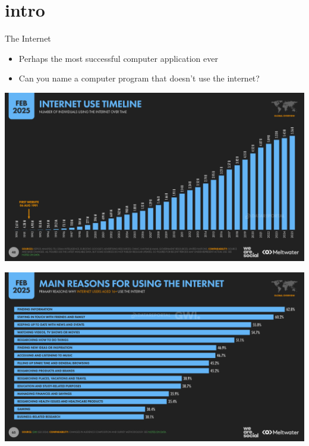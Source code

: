 


\section{intro}

\begin{frame}{The Internet}
    \begin{itemize}
    \item Perhaps the most successful computer application ever
    \item Can you name a computer program that doesn't use the internet?
    \end{itemize}
\end{frame}

\begin{frame}{}
\begin{center}
\includegraphics[width=0.8\pagewidth]{internet_users.png}
\end{center}
\end{frame}

\begin{frame}{}
\begin{center}
\includegraphics[width=0.8\pagewidth]{internet_reasons.png}
\end{center}
\end{frame}

